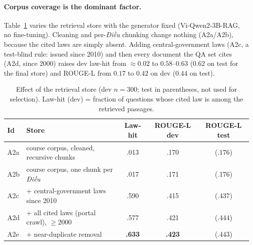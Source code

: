 \documentclass[11pt,a4paper]{article}
\newcommand{\rl}{ROUGE-L}
\newcommand{\dieu}{\textit{Điều}}
\newcommand{\best}[1]{\textbf{#1}}
\begin{document}
\paragraph{Corpus coverage is the dominant factor.}
Table~\ref{tab:corpus} varies the retrieval store with the generator fixed (Vi-Qwen2-3B-RAG, no fine-tuning). Cleaning and per-\dieu{} chunking change nothing (A2a/A2b), because the cited laws are simply absent. Adding central-government laws (A2c, a test-blind rule: issued since 2010) and then every document the QA set cites (A2d, since 2000) raises dev law-hit from $\approx0.02$ to $0.58$--$0.63$ ($0.62$ on test for the final store) and \rl{} from $0.17$ to $0.42$ on dev ($0.44$ on test).
\begin{table}[H]
\centering
\caption{Effect of the retrieval store (dev $n{=}300$; test in parentheses, not used for selection). Law-hit (dev) = fraction of questions whose cited law is among the retrieved passages.}\label{tab:corpus}
\begin{tabular}{@{}llccc@{}}
\toprule
Id & Store & Law-hit & \rl{} dev & \rl{} test\\
\midrule
A2a & course corpus, cleaned, recursive chunks & .013 & .170 & (.176)\\
A2b & course corpus, one chunk per \dieu & .017 & .171 & (.176)\\
A2c & + central-government laws since 2010 & .590 & .415 & (.437)\\
A2d & + all cited laws (portal crawl), $\ge$2000 & .577 & .421 & (.444)\\
A2e & + near-duplicate removal & \best{.633} & \best{.423} & (.443)\\
\bottomrule
\end{tabular}
\end{table}
\end{document}
